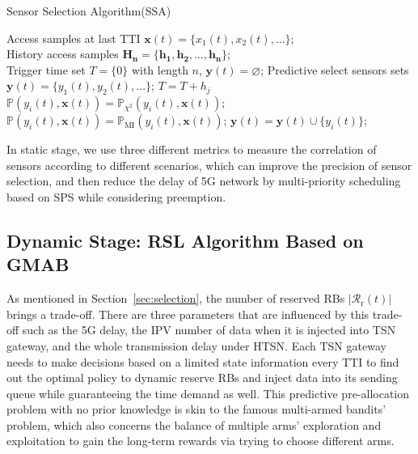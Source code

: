 \documentclass{SCIS2021}
\begin{document}
	\begin{algorithm}
		\renewcommand{\algorithmicrequire}{\textbf{Input:}}%
		\renewcommand{\algorithmicensure}{\textbf{Output:}}%
		\footnotesize
		\caption{Sensor Selection Algorithm(SSA)}
		\label{alg1}
		{\fontsize{10}{12}\selectfont
			\begin{algorithmic}[1]
				\REQUIRE Access samples at last TTI $\bm{x}(t)=\{x_{1}(t), x_{2}(t), ...\}$;\\ \qquad  History access samples $\bm{H_{n}} = \{\bm{h_{1}, h_{2}, ..., h_{n}}\}$;\\ \qquad Trigger time set $T = \{0\} $ with length $n$, $\bm{y}(t) = \varnothing$;
				\ENSURE Predictive select sensors sets $\bm{y}(t) = \{y_{1}(t), y_{2}(t), ...\}$;
				\STATE $T = T + h_{j}$
				\ENDWHILE
				\STATE $\mathbb{P}(y_{i}(t), \bm{x}(t)) = \mathbb{P}_{\chi^{2}}(y_{i}(t), \bm{x}(t))$;
				\STATE $\mathbb{P}(y_{i}(t), \bm{x}(t)) = \mathbb{P}_{\mathrm{MI}}(y_{i}(t), \bm{x}(t))$;
				\ENDIF
				\STATE $\bm{y}(t) = \bm{y}(t)\cup \lbrace y_{i}(t)\rbrace $;
				\ENDIF
				\ENDWHILE
			\end{algorithmic}
		}
	\end{algorithm}
	
	\par In static stage, we use three different metrics to measure the correlation of sensors according to different scenarios, which can improve the precision of sensor selection, and then reduce the delay of 5G network by multi-priority scheduling based on SPS while considering preemption.
	
	
	\subsection{Dynamic Stage: RSL Algorithm Based on GMAB}
	As mentioned in Section~\ref{sec:selection}, the number of reserved RBs $\left|\mathcal{R}_\mathrm{r}(t)\right|$ brings a trade-off. There are three parameters that are influenced by this trade-off such as the 5G delay, the IPV number of data when it is injected into TSN gateway, and the whole transmission delay under HTSN. Each TSN gateway needs to make decisions based on a limited state information every TTI to find out the optimal policy to dynamic reserve RBs and inject data into its sending queue while guaranteeing the time demand as well. This predictive pre-allocation problem with no prior knowledge is skin to the famous multi-armed bandits' problem\cite{li2018predictive,arora2011sequential,xu2017data}, which also concerns the balance of multiple arms' exploration and exploitation to gain the long-term rewards via trying to choose different arms.
	
\end{document}
